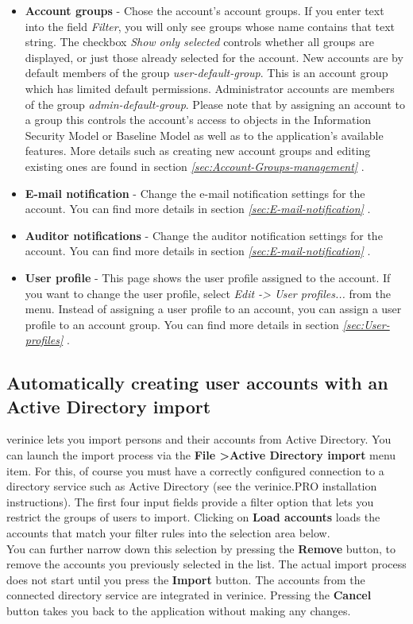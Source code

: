 \documentclass[a4paper,10pt]{book}
\begin{document}
\begin{itemize}
\item \textbf{Account groups} - Chose the account’s account groups. If you enter text into the field \textit{Filter}, you will only see groups whose name contains that text string. The checkbox \textit{Show only selected} controls whether all groups are displayed, or just those already selected for the account. New accounts are by default members of the group \textit{user-default-group}. This is an account group which has limited default permissions. Administrator accounts are members of the group \textit{admin-default-group}. Please note that by assigning an account to a group this controls the account’s access to objects in the Information Security Model or Baseline Model as well as to the application’s available features. More details such as creating new account groups and editing existing ones are found in section {\em \ref{sec:Account-Groups-management} }.
\item \textbf{E-mail notification} - Change the e-mail notification settings for the account. You can find more details in section {\em \ref{sec:E-mail-notification} }.
\item \textbf{Auditor notifications} - Change the auditor notification settings for the account. You can find more details in section {\em \ref{sec:E-mail-notification} }.
\item \textbf{User profile} - This page shows the user profile assigned to the account. If you want to change the user profile, select \textit{Edit -> User profiles...} from the menu. Instead of assigning a user profile to an account, you can assign a user profile to an account group. You can find more details in section {\em \ref{sec:User-profiles} }.
\end{itemize}

\subsection{Automatically creating user accounts with an Active Directory import} \label{Automatically creating user accounts with an Active Directory import}
verinice lets you import persons and their accounts from Active Directory. You can launch the import process via the
\textbf{File \textgreater Active Directory import} menu item. For this, of course you must have a correctly
configured connection to a directory service such as Active Directory (see the verinice.PRO installation instructions).
The first four input fields provide a filter option that lets you restrict the groups of users to import. Clicking on
\textbf{Load accounts} loads the accounts that match your filter rules into the selection area below.
\newline\\
You can further narrow down this selection by pressing the \textbf{Remove} button, to remove the accounts you previously
selected in the list. The actual import process does not start until you press the \textbf{Import} button. The accounts
from the connected directory service are integrated in verinice. Pressing the \textbf{Cancel} button takes you back to the
application without making any changes.
\end{document}
